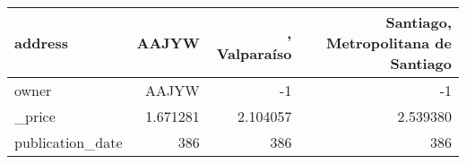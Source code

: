 \begin{table}[H]
\begin{tabular}{|l|r|r|r|}
\hline address & \cellcolor[rgb]{0.9, 0.54, 0.52} AAJYW &  , Valparaíso &  Santiago, Metropolitana de Santiago \\
\hline owner & \cellcolor[rgb]{0.9, 0.54, 0.52} AAJYW & -1 & -1 \\
\hline \_price & \cellcolor[rgb]{0.9, 0.54, 0.52} 1.671281 & 2.104057 & 2.539380 \\
\hline publication\_date & \cellcolor[rgb]{0.9, 0.54, 0.52} 386 & \cellcolor[rgb]{0.9, 0.54, 0.52} 386 & \cellcolor[rgb]{0.9, 0.54, 0.52} 386 \\
\hline
\end{tabular}
\end{table}
